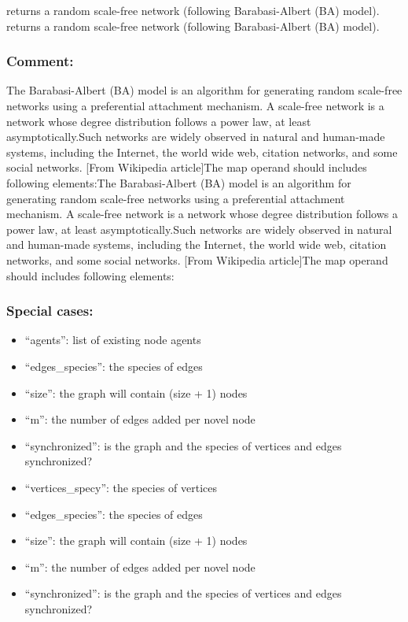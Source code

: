 \documentclass[]{book}
\providecommand{\tightlist}{%
  \setlength{\itemsep}{0pt}\setlength{\parskip}{0pt}}
\theoremstyle{definition}
\theoremstyle{definition}
\theoremstyle{definition}
\theoremstyle{remark}
\begin{document}
returns a random scale-free network (following Barabasi-Albert (BA)
model). returns a random scale-free network (following Barabasi-Albert
(BA) model).

\subsubsection{Comment:}\label{comment-40}

The Barabasi-Albert (BA) model is an algorithm for generating random
scale-free networks using a preferential attachment mechanism. A
scale-free network is a network whose degree distribution follows a
power law, at least asymptotically.Such networks are widely observed in
natural and human-made systems, including the Internet, the world wide
web, citation networks, and some social networks. {[}From Wikipedia
article{]}The map operand should includes following elements:The
Barabasi-Albert (BA) model is an algorithm for generating random
scale-free networks using a preferential attachment mechanism. A
scale-free network is a network whose degree distribution follows a
power law, at least asymptotically.Such networks are widely observed in
natural and human-made systems, including the Internet, the world wide
web, citation networks, and some social networks. {[}From Wikipedia
article{]}The map operand should includes following elements:

\subsubsection{Special cases:}\label{special-cases-67}

\begin{itemize}
\tightlist
\item
  ``agents'': list of existing node agents\\
\item
  ``edges\_species'': the species of edges\\
\item
  ``size'': the graph will contain (size + 1) nodes\\
\item
  ``m'': the number of edges added per novel node\\
\item
  ``synchronized'': is the graph and the species of vertices and edges
  synchronized?\\
\item
  ``vertices\_specy'': the species of vertices\\
\item
  ``edges\_species'': the species of edges\\
\item
  ``size'': the graph will contain (size + 1) nodes\\
\item
  ``m'': the number of edges added per novel node\\
\item
  ``synchronized'': is the graph and the species of vertices and edges
  synchronized?
\end{itemize}
\end{document}
